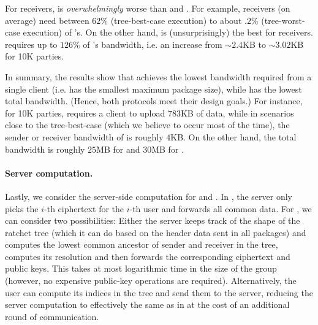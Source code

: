 For receivers, \protITK is \emph{overwhelmingly} worse than \saik and \protCMPKE. For
example, \saik receivers (on average) need between $62\%$ (tree-best-case execution) to about $.2\%$ (tree-worst-case execution)
of \protITK's. On the other hand, \protCMPKE is (unsurprisingly) the best for receivers.  \saik requires up to $126\%$
of \protCMPKE's bandwidth, i.e. an increase from $\sim 2.4$KB to $\sim 3.02$KB for 10K parties.

In summary, the results show that \saik achieves the lowest bandwidth required from a single client (i.e. has the
smallest maximum package size), while \protCMPKE has the lowest total bandwidth. (Hence, both protocols meet their design goals.) For instance, for 10K parties, \protCMPKE requires a client to upload $783$KB of data, while in scenarios close to the tree-best-case (which we believe to occur most of the time), the sender or receiver bandwidth of \saik is roughly $4$KB. On the other hand, the total bandwidth is roughly $25$MB for \protCMPKE and $30$MB for \saik.

\paragraph{Server computation.}
Lastly, we consider the server-side computation for \saik and \protCMPKE. In \protCMPKE, the server only picks the
$i$-th \mPKE ciphertext for the $i$-th user and forwards all common data. For \saik, we can consider two possibilities:
Either the server keeps track of the shape of the ratchet tree (which it can do based on the header data sent in all
packages) and computes the lowest common ancestor of sender and receiver in the tree, computes its resolution and then
forwards the corresponding ciphertext and public keys. This takes at most logarithmic time in the size of the
group (however, no expensive public-key operations are required). Alternatively, the user can compute its indices in the
tree and send them to the server, reducing the server computation to effectively the same as in \protCMPKE at the cost
of an additional round of communication.

